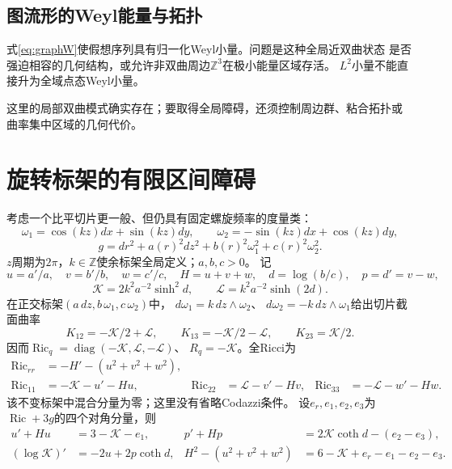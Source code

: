 \documentclass[UTF8,a4paper,11pt,fontset=fandol]{ctexart}
\numberwithin{equation}{section}
\theoremstyle{definition}
\newcommand{\Ric}{\operatorname{Ric}}
\newcommand{\Z}{\mathbb Z}
\begin{document}
\subsection{图流形的Weyl能量与拓扑}
式\eqref{eq:graphW}使假想序列具有归一化Weyl小量。问题是这种全局近双曲状态
是否强迫相容的几何结构，或允许非双曲周边$\Z^3$在极小能量区域存活。
$L^2$小量不能直接升为全域点态Weyl小量。

这里的局部双曲模式确实存在；要取得全局障碍，还须控制周边群、粘合拓扑或
曲率集中区域的几何代价。

\section{旋转标架的有限区间障碍}
考虑一个比平切片更一般、但仍具有固定螺旋频率的度量类：
\[
 \omega_1=\cos(kz)dx+\sin(kz)dy,\qquad
 \omega_2=-\sin(kz)dx+\cos(kz)dy,
\]
\[
 g=dr^2+a(r)^2dz^2+b(r)^2\omega_1^2+c(r)^2\omega_2^2.
\]
$z$周期为$2\pi$，$k\in\Z$使余标架全局定义；$a,b,c>0$。
记
\[
 u=a'/a,\quad v=b'/b,\quad w=c'/c,\quad H=u+v+w,\quad
 d=\log(b/c),\quad p=d'=v-w,
\]
\[
 \mathcal K=2k^2a^{-2}\sinh^2d,\qquad
 \mathcal L=k^2a^{-2}\sinh(2d).
\]
在正交标架$(a\,dz,b\,\omega_1,c\,\omega_2)$中，
$d\omega_1=k\,dz\wedge\omega_2$、
$d\omega_2=-k\,dz\wedge\omega_1$给出切片截面曲率
\[
 K_{12}=-\mathcal K/2+\mathcal L,\qquad
 K_{13}=-\mathcal K/2-\mathcal L,\qquad K_{23}=\mathcal K/2.
\]
因而$\Ric_q=\operatorname{diag}(-\mathcal K,\mathcal L,-\mathcal L)$、
$R_q=-\mathcal K$。全Ricci为
\begin{align*}
 \Ric_{rr}&=-H'-(u^2+v^2+w^2),\\
 \Ric_{11}&=-\mathcal K-u'-Hu,&
 \Ric_{22}&=\mathcal L-v'-Hv,&
 \Ric_{33}&=-\mathcal L-w'-Hw.
\end{align*}
该不变标架中混合分量为零；这里没有省略Codazzi条件。
设$e_r,e_1,e_2,e_3$为$\Ric+3g$的四个对角分量，则
\begin{align}
 u'+Hu&=3-\mathcal K-e_1,&
 p'+Hp&=2\mathcal K\coth d-(e_2-e_3),\label{eq:helical-ode}\\
 (\log\mathcal K)'&=-2u+2p\coth d,&
 H^2-(u^2+v^2+w^2)&=6-\mathcal K+e_r-e_1-e_2-e_3.\nonumber
\end{align}
\end{document}
